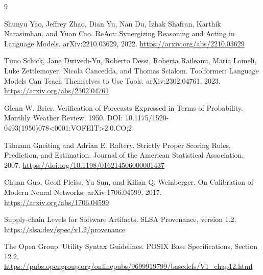 \documentclass[11pt]{article}
\begin{document}
\begin{thebibliography}{9}

Shunyu Yao, Jeffrey Zhao, Dian Yu, Nan Du, Izhak Shafran, Karthik Narasimhan, and Yuan Cao.
\newblock ReAct: Synergizing Reasoning and Acting in Language Models.
\newblock arXiv:2210.03629, 2022.
\newblock \url{https://arxiv.org/abs/2210.03629}

Timo Schick, Jane Dwivedi-Yu, Roberto Dessi, Roberta Raileanu, Maria Lomeli, Luke Zettlemoyer, Nicola Cancedda, and Thomas Scialom.
\newblock Toolformer: Language Models Can Teach Themselves to Use Tools.
\newblock arXiv:2302.04761, 2023.
\newblock \url{https://arxiv.org/abs/2302.04761}

Glenn W. Brier.
\newblock Verification of Forecasts Expressed in Terms of Probability.
\newblock Monthly Weather Review, 1950.
\newblock DOI: 10.1175/1520-0493(1950)078<0001:VOFEIT>2.0.CO;2

Tilmann Gneiting and Adrian E. Raftery.
\newblock Strictly Proper Scoring Rules, Prediction, and Estimation.
\newblock Journal of the American Statistical Association, 2007.
\newblock \url{https://doi.org/10.1198/016214506000001437}

Chuan Guo, Geoff Pleiss, Yu Sun, and Kilian Q. Weinberger.
\newblock On Calibration of Modern Neural Networks.
\newblock arXiv:1706.04599, 2017.
\newblock \url{https://arxiv.org/abs/1706.04599}

Supply-chain Levels for Software Artifacts.
\newblock SLSA Provenance, version 1.2.
\newblock \url{https://slsa.dev/spec/v1.2/provenance}

The Open Group.
\newblock Utility Syntax Guidelines.
\newblock POSIX Base Specifications, Section 12.2.
\newblock \url{https://pubs.opengroup.org/onlinepubs/9699919799/basedefs/V1_chap12.html}

\end{thebibliography}
\end{document}
